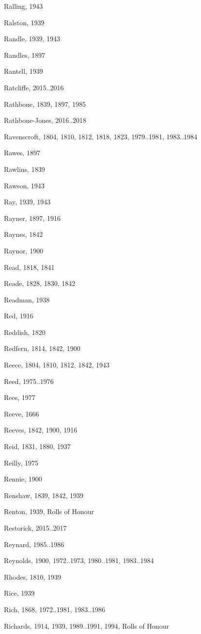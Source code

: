 \begin{theindex}
\item Ralling, 1943
\item Ralston, 1939
\item Randle, 1939, 1943
\item Randles, 1897
\item Rantell, 1939
\item Ratcliffe, 2015..2016
\item Rathbone, 1839, 1897, 1985
\item Rathbone-Jones, 2016..2018
\item Ravenscroft, 1804, 1810, 1812, 1818, 1823, 1979..1981, 1983..1984
\item Rawes, 1897
\item Rawlins, 1839
\item Rawson, 1943
\item Ray, 1939, 1943
\item Rayner, 1897, 1916
\item Raynes, 1842
\item Raynor, 1900
\item Read, 1818, 1841
\item Reade, 1828, 1830, 1842
\item Readman, 1938
\item Red, 1916
\item Reddish, 1820
\item Redfern, 1814, 1842, 1900
\item Reece, 1804, 1810, 1812, 1842, 1943
\item Reed, 1975..1976
\item Rees, 1977
\item Reeve, 1666
\item Reeves, 1842, 1900, 1916
\item Reid, 1831, 1880, 1937
\item Reilly, 1975
\item Rennie, 1900
\item Renshaw, 1839, 1842, 1939
\item Renton, 1939, Rolls of Honour
\item Restorick, 2015..2017
\item Reynard, 1985..1986
\item Reynolds, 1900, 1972..1973, 1980..1981, 1983..1984
\item Rhodes, 1810, 1939
\item Rice, 1939
\item Rich, 1868, 1972..1981, 1983..1986
\item Richards, 1914, 1939, 1989..1991, 1994, Rolls of Honour

\end{theindex}
